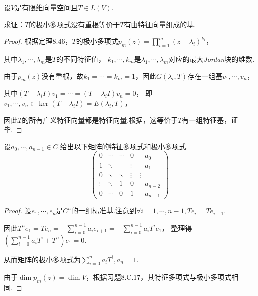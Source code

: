 \begin{problem}[12]\label{8.C.12}
    设\(V\)是有限维向量空间且\(T \in L(V)\).

    求证：\(T\)的极小多项式没有重根等价于\(T\)有由特征向量组成的基.
\end{problem}

\begin{proof}
    根据定理8.46，\(T\)的极小多项式\(p_m(z)=\prod_{i=1}^m (z-\lambda_i)^{k_i}\)，

    其中\(\lambda_1,\cdots,\lambda_m\)是\(T\)的不同特征值，
    \(k_1,\cdots,k_m\)是\(\lambda_1,\cdots,\lambda_m\)对应的最大\textit{Jordan}块的维数.
    
    由于\(p_m(z)\)没有重根，故\(k_1=\cdots=k_m=1\)，因此\(G(\lambda_i,T)\)存在一组基\(v_1,\cdots,v_n\)，
    
    其中\((T-\lambda_i I)v_1=\cdots=(T-\lambda_i I)v_n=0\)，
    即\(v_1,\cdots,v_n \in \ker (T-\lambda_i I)=E(\lambda_i,T)\)，
    
    因此\(T\)的所有广义特征向量都是特征向量.根据，这等价于\(T\)有一组特征基，证毕.
\end{proof}

\begin{problem}[18]\label{8.C.18}
    设\(a_0,\cdots,a_{n-1} \in C\).给出以下矩阵的特征多项式和极小多项式.
    \begin{equation*}
        \begin{pmatrix}
            0      & \cdots & \cdots & 0      & -a_0     \\
            1      & \ddots &        & \vdots & -a_1     \\
            0      & \ddots & \ddots & \vdots & \vdots   \\
            \vdots & \ddots & 1      & 0      & -a_{n-2} \\
            0      & \cdots & 0      & 1      & -a_{n-1} 
        \end{pmatrix}
    \end{equation*}
\end{problem}

\begin{proof}
    设\(e_1,\cdots,e_n\)是\(C^n\)的一组标准基.注意到\(\forall i=1,\cdots,n-1,Te_i=Te_{i+1}\).

    因此\(T^n e_1=Te_n=-\sum_{i=0}^{n-1}a_ie_{i+1}=-\sum_{i=0}^{n-1}a_iT^ie_1\)，
    整理得\((\sum_{i=0}^{n-1}a_iT^i+T^n)e_1=0\).
    
    从而矩阵的极小多项式为\(\sum_{i=0}^n a_iT^i,a_n=1\).
    
    由于\(\dim p_m(z)=\dim V\)，根据习题8.C.17，其特征多项式与极小多项式相同.
    
\end{proof}

